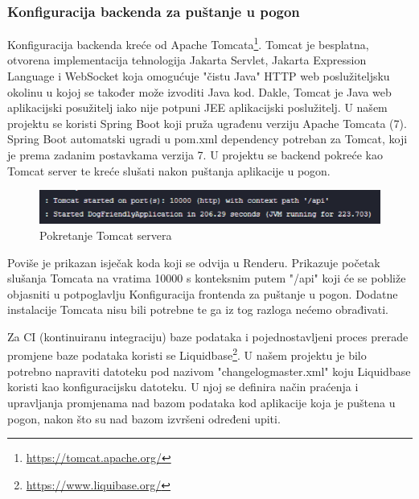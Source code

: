         \subsubsection{Konfiguracija backenda za puštanje u pogon}

        Konfiguracija backenda kreće od Apache Tomcata\footnote{\url{https://tomcat.apache.org/}}. Tomcat je besplatna, otvorena implementacija tehnologija Jakarta Servlet, Jakarta Expression Language i WebSocket koja omogućuje "čistu Java" HTTP web poslužiteljsku okolinu u kojoj se također može izvoditi Java kod. Dakle, Tomcat je Java web aplikacijski posužitelj iako nije potpuni JEE aplikacijski poslužitelj. 
        U našem projektu se koristi Spring Boot koji pruža ugrađenu verziju Apache Tomcata (7). Spring Boot automatski ugradi u pom.xml dependency potreban za Tomcat, koji je prema zadanim postavkama verzija 7. U projektu se backend pokreće kao Tomcat server te kreće slušati nakon puštanja aplikacije u pogon. 
        \begin{figure}[H]
                \includegraphics[width=\textwidth]{slike/deploy-backend.png} 
                    \caption{Pokretanje Tomcat servera}
                \label{fig:Pokretanje Tomcat servera}
            \end{figure} 
        Poviše je prikazan isječak koda koji se odvija u Renderu. Prikazuje početak slušanja Tomcata na vratima 10000 s konteksnim putem "/api" koji će se pobliže objasniti u potpoglavlju Konfiguracija frontenda za puštanje u pogon.
        Dodatne instalacije Tomcata nisu bili potrebne te ga iz tog razloga nećemo obrađivati. 

        Za CI (kontinuiranu integraciju) baze podataka i pojednostavljeni proces prerade promjene baze podataka koristi se Liquidbase\footnote{\url{https://www.liquibase.org/}}. U našem projektu je bilo potrebno napraviti datoteku pod nazivom "changelog\textunderscore master.xml" koju Liquidbase koristi kao konfiguracijsku datoteku. U njoj se definira način praćenja i upravljanja promjenama nad bazom podataka kod aplikacije koja je puštena u pogon, nakon što su nad bazom izvršeni određeni upiti.

